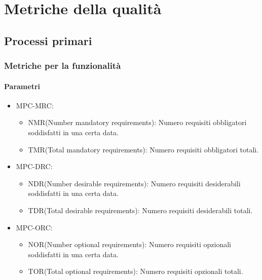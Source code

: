 

\section{Metriche della qualità}
\subsection{Processi primari}
\subsubsection{Metriche per la funzionalità}
\paragraph{Parametri}
\begin{itemize}
    \item MPC-MRC:
          \begin{itemize}
              \item NMR(Number mandatory requirements):  Numero requisiti obbligatori soddisfatti in una certa data.
              \item TMR(Total mandatory requirements):  Numero requisiti obbligatori totali.
          \end{itemize}
    \item MPC-DRC:
          \begin{itemize}
              \item NDR(Number desirable requirements): Numero requisiti desiderabili soddisfatti in una certa data.
              \item TDR(Total desirable requirements): Numero requisiti desiderabili totali.
          \end{itemize}
    \item MPC-ORC:
          \begin{itemize}
              \item NOR(Number optional requirements): Numero requisiti opzionali soddisfatti in una certa data.
              \item TOR(Total optional requirements): Numero requisiti opzionali totali.
          \end{itemize}
\end{itemize}
